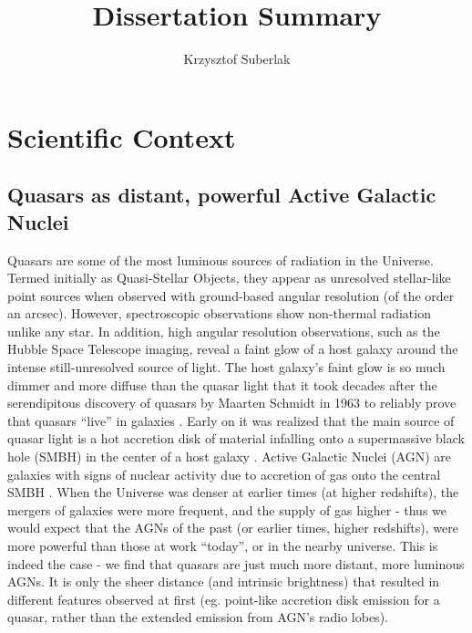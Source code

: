 \documentclass[modern]{aastex62}
\begin{document}
\title{Dissertation Summary}
\author{Krzysztof Suberlak}


\section{Scientific Context}

\subsection{Quasars as distant, powerful Active Galactic Nuclei}
Quasars are some of the most luminous sources of radiation in the Universe.  Termed initially as Quasi-Stellar Objects, they appear as unresolved stellar-like point sources when observed with ground-based angular resolution (of the order an arcsec). However, spectroscopic observations show non-thermal radiation unlike any star. In addition, high angular resolution observations, such as the Hubble Space Telescope imaging, reveal a faint glow of a host galaxy around the intense still-unresolved source of light. The host galaxy's faint glow is so much dimmer and more diffuse than the quasar light that it took decades after the serendipitous discovery of quasars by Maarten Schmidt in 1963 \citep{schmidt1963, richards2009a} to reliably prove that quasars ``live'' in galaxies \citep{hooper1997, boyce1999, lehnert1999}. Early on it was realized that the main source of quasar light is a hot accretion disk of material infalling onto a supermassive black hole (SMBH) in the center of a host galaxy \citep{oke1965, burbidge1967}. Active Galactic Nuclei (AGN) are galaxies with signs of nuclear activity due to accretion of gas onto the central SMBH \citep{netzer2013}. When the Universe was denser at earlier times (at higher redshifts), the mergers of galaxies were more frequent, and the supply of gas higher -  thus we would expect that the AGNs of the past (or earlier times, higher redshifts), were more powerful than those at work ``today'', or in the nearby universe. This is indeed the case - we find that quasars are just much more distant, more luminous AGNs. It is only the sheer distance (and intrinsic brightness) that resulted in different features observed at first (eg. point-like accretion disk emission for a quasar, rather than the extended emission from AGN's radio lobes).  
\end{document}
